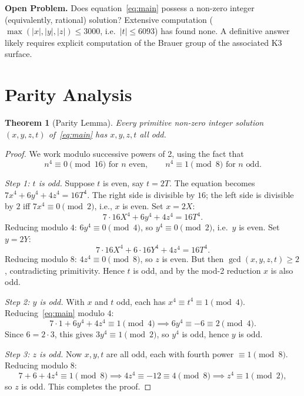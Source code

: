 \documentclass[12pt, a4paper]{article}
\newtheorem{theorem}{Theorem}[section]
\theoremstyle{definition}
\begin{document}
\begin{tcolorbox}[open,colback=orange!6,colframe=orange!60]
  \textbf{Open Problem.}  Does equation~\eqref{eq:main} possess a non-zero
  integer (equivalently, rational) solution?  Extensive computation
  ($\max(|x|,|y|,|z|) \leq 3000$, i.e.\ $|t| \leq 6093$) has found none.
  A definitive answer likely requires explicit computation of the Brauer group
  of the associated K3 surface.
\end{tcolorbox}

\section{Parity Analysis}

\begin{theorem}[Parity Lemma]\label{thm:parity}
  Every primitive non-zero integer solution $(x,y,z,t)$ of~\eqref{eq:main}
  has $x,y,z,t$ all odd.
\end{theorem}

\begin{proof}
We work modulo successive powers of 2, using the fact that
\begin{equation*}
  n^4 \equiv 0 \pmod{16} \text{ for } n \text{ even}, \qquad
  n^4 \equiv 1 \pmod{8}  \text{ for } n \text{ odd}.
\end{equation*}

\medskip\noindent\textit{Step 1: $t$ is odd.}
Suppose $t$ is even, say $t = 2T$.  The equation becomes
$7x^4 + 6y^4 + 4z^4 = 16T^4$.
The right side is divisible by $16$; the left side is divisible by $2$ iff
$7x^4 \equiv 0 \pmod{2}$, i.e., $x$ is even.  Set $x = 2X$:
\[
  7 \cdot 16X^4 + 6y^4 + 4z^4 = 16T^4.
\]
Reducing modulo $4$: $6y^4 \equiv 0 \pmod{4}$, so $y^4 \equiv 0 \pmod{2}$, i.e.\ $y$ is even.
Set $y = 2Y$:
\[
  7 \cdot 16X^4 + 6 \cdot 16Y^4 + 4z^4 = 16T^4.
\]
Reducing modulo $8$: $4z^4 \equiv 0 \pmod{8}$, so $z$ is even.
But then $\gcd(x,y,z,t) \geq 2$, contradicting primitivity.
Hence $t$ is odd, and by the mod-2 reduction $x$ is also odd.

\medskip\noindent\textit{Step 2: $y$ is odd.}
With $x$ and $t$ odd, each has $x^4 \equiv t^4 \equiv 1 \pmod{4}$.
Reducing~\eqref{eq:main} modulo $4$:
\[
  7 \cdot 1 + 6y^4 + 4z^4 \equiv 1 \pmod{4}
  \implies 6y^4 \equiv -6 \equiv 2 \pmod{4}.
\]
Since $6 = 2 \cdot 3$, this gives $3y^4 \equiv 1 \pmod{2}$, so $y^4$ is odd, hence $y$ is odd.

\medskip\noindent\textit{Step 3: $z$ is odd.}
Now $x,y,t$ are all odd, each with fourth power $\equiv 1 \pmod{8}$.
Reducing modulo $8$:
\[
  7 + 6 + 4z^4 \equiv 1 \pmod{8}
  \implies 4z^4 \equiv -12 \equiv 4 \pmod{8}
  \implies z^4 \equiv 1 \pmod{2},
\]
so $z$ is odd.  This completes the proof.
\end{proof}
\end{document}

